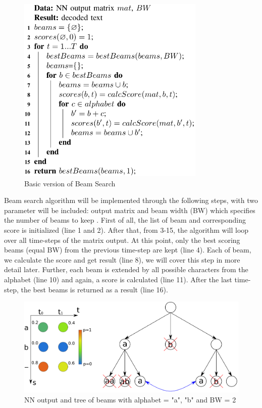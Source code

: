       \begin{figure}[H]
        \centering
        \includegraphics[width=0.8\textwidth]{img/Chap3/Basic-Version-BeamSearch}
        \caption{ Basic version of Beam Search }
        \label{fig:Chap3-Basic-Version-BeamSearch}
      \end{figure}
      
      
      Beam search algorithm will be implemented through the following steps, with two
      parameter will be included: output matrix and beam width (BW) which specifies the number
      of beams to keep . First of all, the list of beam and corresponding score is 
      initialized (line 1 and 2). After that, from 3-15, the algorithm will loop over all time-steps
      of the matrix output. At this point, only the best scoring beams (equal BW) from the previous
      time-step are kept (line 4). Each of beam, we calculate the score and get result (line 8), we will cover
      this step in more detail later. Further, each beam is extended by all possible characters from
      the alphabet (line 10) and again, a score is calculated (line 11). After the last time-step,
      the best beams is returned as a result (line 16).


      \begin{figure}[H]
        \centering
        \includegraphics[width=\textwidth]{img/Chap3/BeamSearchTree}
        \caption{ NN output and tree of beams with alphabet = {"a", "b"} and BW = 2 }
        \label{fig:Chap3-BSTree}
      \end{figure}

